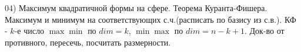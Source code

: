04) Максимум квадратичной формы на сфере. Теорема Куранта-Фишера.\\
Максимум и минимум на соответствующих с.ч.(расписать по базису из с.в.). КФ - $k$-е число $\max \min$ по $dim = k$, $\min \max$ по $dim = n - k + 1$. Док-во от противного, пересечь, посчитать размерности.
